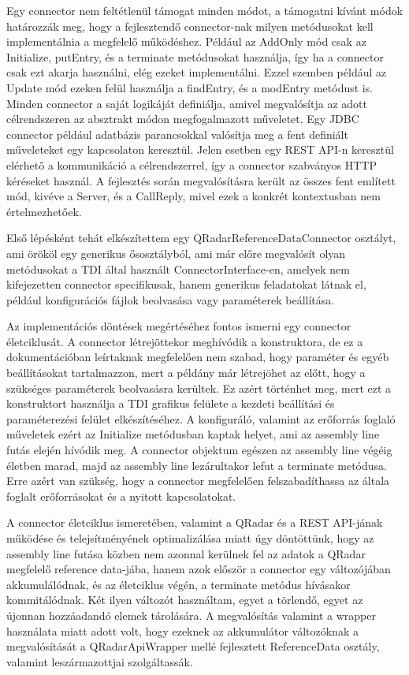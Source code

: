 Egy connector nem feltétlenül támogat minden módot, a támogatni kívánt módok határozzák meg, hogy a fejlesztendő connector-nak milyen metódusokat kell implementálnia a megfelelő működéshez. 
Például az AddOnly mód csak az Initialize, putEntry, és a terminate metódusokat használja, így ha a connector csak ezt akarja használni, elég ezeket implementálni. Ezzel szemben például az Update mód ezeken felül használja a findEntry, és a modEntry metódust is. Minden connector a saját logikáját definiálja, amivel megvalósítja az adott célrendszeren az absztrakt módon megfogalmazott műveletet. Egy JDBC connector például adatbázis parancsokkal valósítja meg a fent definiált műveleteket egy kapcsolaton keresztül. Jelen esetben egy REST API-n keresztül elérhető a kommunikáció a célrendszerrel, így a connector szabványos HTTP kéréseket használ. A fejlesztés során megvalósításra került az összes fent említett mód, kivéve a Server, és a CallReply, mivel ezek a konkrét kontextusban nem értelmezhetőek.

Első lépésként tehát elkészítettem egy QRadarReferenceDataConnector osztályt, ami örököl egy generikus ősosztályból, ami már előre megvalósít olyan metódusokat a TDI által használt ConnectorInterface-en, amelyek nem kifejezetten connector specifikusak, hanem generikus feladatokat látnak el, például konfigurációs fájlok beolvasása vagy paraméterek beállítása.

Az implementációs döntések megértéséhez fontos ismerni egy connector életciklusát. A connector létrejöttekor meghívódik a konstruktora, de ez a dokumentációban leírtaknak megfelelően nem szabad, hogy paraméter és egyéb beállításokat tartalmazzon, mert a példány már létrejöhet az előtt, hogy a szükséges paraméterek beolvasásra kerültek. Ez azért történhet meg, mert ezt a konstruktort használja a TDI grafikus felülete a kezdeti beállítási és paraméterezési felület elkészítéséhez. A konfiguráló, valamint az erőforrás foglaló műveletek ezért az Initialize metódusban kaptak helyet, ami az assembly line futás elején hívódik meg. A connector objektum egészen az assembly line végéig életben marad, majd az assembly line lezárultakor lefut a terminate metódusa. Erre azért van szükség, hogy a connector megfelelően felszabadíthassa az általa foglalt erőforrásokat és a nyitott kapcsolatokat.

A connector életciklus ismeretében, valamint a QRadar és a REST API-jának működése és telejsítményének optimalizálása miatt úgy döntöttünk, hogy az assembly line futása közben nem azonnal kerülnek fel az adatok a QRadar megfelelő reference data-jába, hanem azok először a connector egy változójában akkumulálódnak, és az életciklus végén, a terminate metódus hívásakor kommitálódnak. Két ilyen változót használtam, egyet a törlendő, egyet az újonnan hozzáadandó elemek tárolására. A megvalósítás valamint a wrapper használata miatt adott volt, hogy ezeknek az akkumulátor változóknak a megvalósítását a QRadarApiWrapper mellé fejlesztett ReferenceData osztály, valamint leszármazottjai szolgáltassák.

